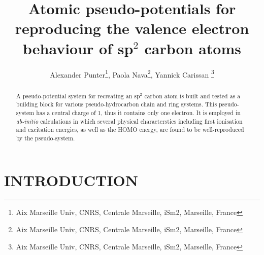 \documentclass[12pt]{article}
\title{Atomic pseudo-potentials for reproducing the valence electron behaviour of sp$^2$ carbon atoms}
\author{Alexander Punter\thanks{Aix Marseille Univ, CNRS, Centrale Marseille, iSm2, Marseille, France}, Paola Nava\thanks{Aix Marseille Univ, CNRS, Centrale Marseille, iSm2, Marseille, France}, Yannick Carissan \thanks{Aix Marseille Univ, CNRS, Centrale Marseille, iSm2, Marseille, France}}
\begin{document}
\maketitle


\begin{abstract}
A pseudo-potential system for recreating an sp\(^{2}\) carbon atom is built 
and tested as a building block for various pseudo-hydrocarbon chain and ring systems.  
This pseudo-system has a central charge of 1, thus it contains only one
electron. It is employed in \textsl{ab-initio} calculations in which several physical characterstics
including first ionisation and excitation energies, as well as the HOMO energy, 
are found to be well-reproduced by the pseudo-system.
\end{abstract}


\clearpage



  \makeatletter
  \renewcommand\@biblabel[1]{#1.}
  \makeatother



\renewcommand{\baselinestretch}{1.5}
\normalsize


\clearpage


\section*{\sffamily \Large INTRODUCTION}

\end{document}
